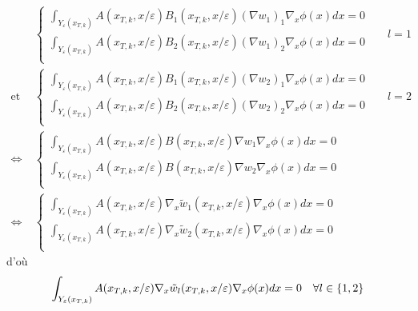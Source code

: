\documentclass[11pt]{article}
\newcommand{\Ye}{Y_\varepsilon}
\newcommand{\tw}{\tilde{w}}
\begin{document}
\begin{equation}
  \begin{aligned}
    &\begin{cases}
      \int_{\Ye(x_{T,k})} A(x_{T,k}, x/\varepsilon) B_1(x_{T,k}, x/\varepsilon) (\nabla w_1)_1 \nabla_x \phi(x) dx = 0 \\
      \int_{\Ye(x_{T,k})} A(x_{T,k}, x/\varepsilon) B_2(x_{T,k}, x/\varepsilon) (\nabla w_1)_2 \nabla_x \phi(x) dx = 0 \\
    \end{cases} && l=1\\
    \text{et}~~ &\begin{cases}
      \int_{\Ye(x_{T,k})} A(x_{T,k}, x/\varepsilon)B_1(x_{T,k}, x/\varepsilon) (\nabla w_2)_1 \nabla_x \phi(x) dx = 0 \\
      \int_{\Ye(x_{T,k})} A(x_{T,k}, x/\varepsilon)B_2(x_{T,k}, x/\varepsilon) (\nabla w_2)_2 \nabla_x \phi(x) dx = 0 \\ 
    \end{cases} && l=2\\
    \iff &\begin{cases}
      \int_{\Ye(x_{T,k})} A(x_{T,k}, x/\varepsilon)B(x_{T,k}, x/\varepsilon) \nabla w_1 \nabla_x \phi(x) dx = 0 \\
      \int_{\Ye(x_{T,k})} A(x_{T,k}, x/\varepsilon)B(x_{T,k}, x/\varepsilon) \nabla w_2 \nabla_x \phi(x) dx = 0 \\ 
    \end{cases} \\
    \iff &\begin{cases}
      \int_{\Ye(x_{T,k})} A(x_{T,k}, x/\varepsilon)\nabla_x \tw_1(x_{T,k}, x/\varepsilon) \nabla_x \phi(x) dx = 0 \\
      \int_{\Ye(x_{T,k})} A(x_{T,k}, x/\varepsilon)\nabla_x \tw_2(x_{T,k}, x/\varepsilon) \nabla_x \phi(x) dx = 0 \\ 
    \end{cases}
  \end{aligned}
\end{equation}
d'où 
\begin{equation}
  \label{eq:pbcelltw}
  \int_{\Ye(x_{T,k})} A(x_{T,k}, x/\varepsilon)\nabla_x \tw_l(x_{T,k}, x/\varepsilon) \nabla_x \phi(x) dx = 0 \quad \forall l \in \{1,2\}\\
\end{equation}                                       
\end{document}

